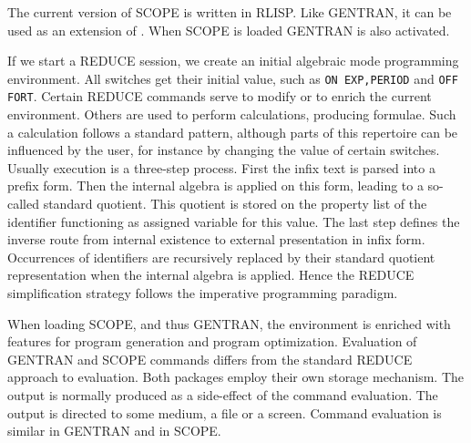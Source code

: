 The current version of SCOPE is written in RLISP. 
Like GENTRAN, it can be used as an extension of {\REDUCE}.
When SCOPE is loaded GENTRAN is also activated.

If we start a REDUCE session, we create an initial algebraic mode 
programming environment. All switches get their initial value, such as 
{\tt ON EXP,PERIOD} and {\tt OFF FORT}. 
Certain REDUCE commands serve to modify or to enrich the current environment.
Others are used to perform calculations, producing formulae. Such a
calculation follows a standard pattern, although parts of this repertoire 
can be influenced by the user, for instance by changing the value of 
certain switches. Usually execution is a three-step process.
First the infix text is parsed into a prefix form.  Then the internal algebra 
is applied on this form, leading to a so-called standard quotient.
This quotient is stored on the property list of the identifier 
functioning as assigned variable for this value. The last step
defines the inverse route from internal existence to external presentation 
in infix form. Occurrences of identifiers are recursively
replaced by their standard quotient representation when the internal algebra
is applied. Hence the REDUCE simplification strategy follows the imperative
programming paradigm.

When loading SCOPE, and thus GENTRAN, the environment is enriched with 
features for program generation and program optimization. 
Evaluation of GENTRAN and SCOPE commands differs from the standard REDUCE
approach to evaluation. Both packages employ their own storage mechanism.
The output is normally produced as a side-effect of the command evaluation.
The output is directed to some medium, a file or a screen. Command evaluation 
is similar in GENTRAN and in SCOPE.

